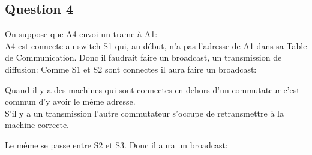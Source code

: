 \documentclass{article}
\begin{document}
\subsection*{Question 4}
\begin{resolution}
    On suppose que A4 envoi un trame à A1:\\

    A4 est connecte au switch S1 qui, au début, n'a pas l'adresse de A1 dans sa Table de Communication. Donc il faudrait faire un broadcast, un transmission de diffusion:
    Comme S1 et S2 sont connectes il aura faire un broadcast:
    \begin{remark}
        Quand il y a des machines qui sont connectes en dehors d'un commutateur c'est commun d'y avoir le même adresse.\\
        
        S'il y a un transmission l'autre commutateur s'occupe de retransmettre à la machine correcte. 
    \end{remark}
    Le même se passe entre S2 et S3. Donc il aura un broadcast:
\end{resolution}

\newpage
\end{document}
